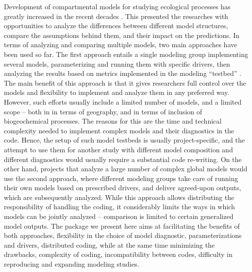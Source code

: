 Development of compartmental models for studying ecological processes has
greatly increased in the recent decades \citep{le_noe_soil_2023,
chandel_microbial_2023, MANZONI20091355}.  This presented the researches with
opportunities to analyze the differences between different model structures,
compare the assumptions behind them, and their impact on the predictions.  In
terms of analyzing and comparing multiple models, two main approaches have been
used so far.  The first approach entails a single modeling group implementing
several models, parameterizing and running them with specific drivers, then
analyzing the results based on metrics implemented in the modeling
``testbed'' \citep{WalkerMultiAssumption2018, SulmanMultiple2018,
LiaoDisentangling2022}. The main benefit of this approach is that it gives
researchers full control over the models and flexibility to implement and
analyze them in any preferred way. However, such efforts usually include a
limited number of models, and a limited scope -- both in in terms of geography,
and in terms of inclusion of biogeochemical processes. The reasons for this
are the time and technical complexity needed to implement complex models and
their diagnostics in the code. Hence, the setup of such model testbeds is
usually project-specific, and the attempt to use them for another study with
different model composition and different diagnostics would usually require a
substantial code re-writing. On the other hand, projects that analyze a large
number of complex global models \citep{Manzoni2009SBB, sitch_recent_2015, eyring_overview_2016, collier_international_2018} would use the second approach, where different
modeling groups take care of running their own models based on prescribed
drivers, and deliver agreed-upon outputs, which are subsequently analyzed.
While this approach allows distributing the responsibility of handling the
coding, it considerably limits the ways in which models can be jointly analyzed
-- comparison is limited to certain generalized model outputs. The package we
present here aims at facilitating the benefits of both approaches, \ie 
flexibility in the choice of model diagnostic, parameterizations and drivers,
distributed coding, while at the same time minimizing the drawbacks, \ie 
complexity of coding, incompatibility between codes, difficulty in reproducing
and expanding modeling studies.

